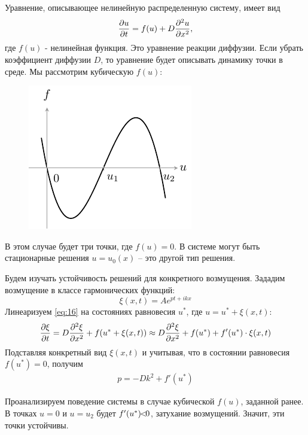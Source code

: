 Уравнение, описывающее нелинейную распределенную систему, имеет вид
\begin{equation}
	\pdv{u}{t}=f\qty(u)+D\pdv[2]{u}{x},
	\label{eq:15}
\end{equation}
где $f(u)$ - нелинейная функция. Это уравнение реакции диффузии. Если убрать коэффициент диффузии $D$, то уравнение будет описывать динамику точки в среде. Мы рассмотрим  кубическую $f(u)$:
\begin{figure}[H]
	\centering
	\includegraphics[scale=1.5]{img/osci_and_wave_in_ordered_struct/cub}
\end{figure}
В этом случае будет три точки, где $f(u)=0$. В системе могут быть стационарные решения $u=u_0(x)$ -- это другой тип решения. 

Будем изучать устойчивость решений для конкретного возмущения. Зададим возмущение в классе гармонических функций: 
\begin{equation*}
	\xi(x,t) = A e^{pt+ikx}
\end{equation*}
Линеаризуем \eqref{eq:16} на состояниях равновесия $u^*$, где $u=u^*+\xi(x,t)$:
\begin{equation}
	\pdv{\xi}{t}=D\pdv[2]{\xi}{x}+f(u^*+\xi(x,t))
	\approx D\pdv[2]{\xi}{x}+f(u^*)+f'(u^*)\cdot\xi(x,t)
	\label{eq:16}
\end{equation}
Подставляя конкретный вид $\xi(x,t)$ и учитывая, что в состоянии равновесия $f(u^*)=0$, получим
\begin{gather*}
	p =-Dk^2+f'(u^*)
\end{gather*}


Проанализируем поведение системы в случае кубической $f(u)$, заданной ранее. В точках  $u=0$ и $u=u_2$ будет $f'(u^*)\hspace{-4pt}<\hspace{-4pt}0$, затухание возмущений. Значит, эти точки устойчивы. 




